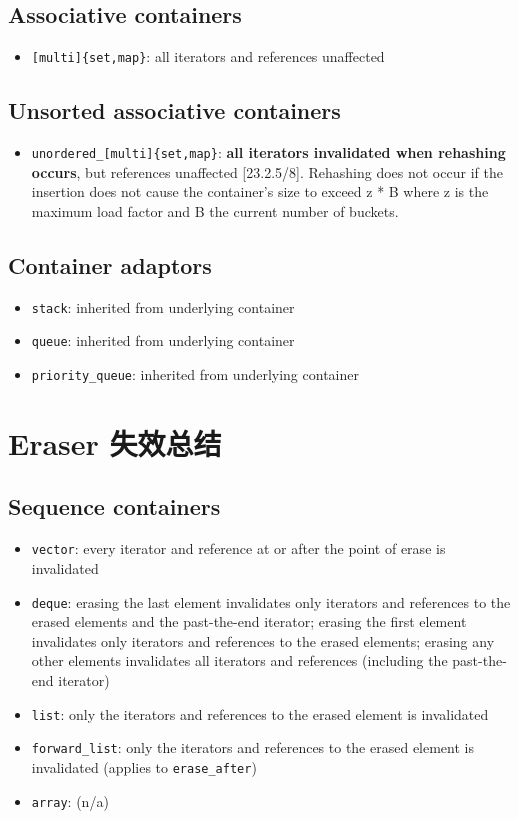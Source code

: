 \documentclass[UTF8,a4paper,12pt]{ctexbook}
\begin{document}
		\subsection{Associative containers}
			\begin{itemize}
				\item \verb|[multi]{set,map}|: all iterators and references unaffected
			\end{itemize}
		\subsection{Unsorted associative containers}
			\begin{itemize}
				\item \verb|unordered_[multi]{set,map}|: \textbf{all iterators invalidated when rehashing occurs}, but references unaffected [23.2.5/8]. Rehashing does not occur if the insertion does not cause the container's size to exceed z * B where z is the maximum load factor and B the current number of buckets.
			\end{itemize}
		
		\subsection{Container adaptors}
			\begin{itemize}
				\item \verb|stack|: inherited from underlying container
				\item \verb|queue|: inherited from underlying container
				\item \verb|priority_queue|: inherited from underlying container
			\end{itemize}
	\section{Eraser 失效总结}
		\subsection{Sequence containers}
			\begin{itemize}
				\item \verb|vector|: every iterator and reference at or after the point of erase is invalidated 
				\item \verb|deque|: erasing the last element invalidates only iterators and references to the erased elements and the past-the-end iterator; erasing the first element invalidates only iterators and references to the erased elements; erasing any other elements invalidates all iterators and references (including the past-the-end iterator)
				\item \verb|list|: only the iterators and references to the erased element is invalidated  
				\item \verb|forward_list|: only the iterators and references to the erased element is invalidated (applies to \verb|erase_after|) 
				\item \verb|array|: (n/a)
			\end{itemize}
\end{document}
